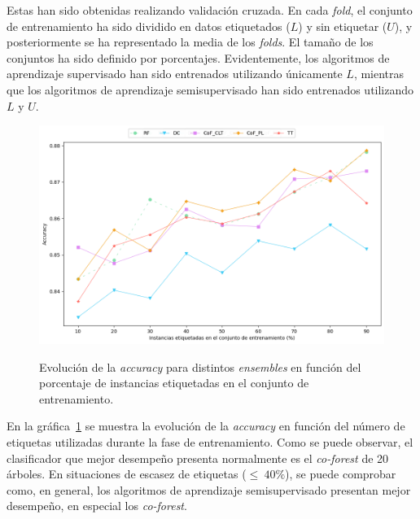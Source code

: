 Estas han sido obtenidas realizando validación cruzada. En cada \textit{fold}, el conjunto de entrenamiento ha sido dividido en datos etiquetados ($L$) y sin etiquetar ($U$), y posteriormente se ha representado la media de los \textit{folds}. El tamaño de los conjuntos ha sido definido por porcentajes. Evidentemente, los algoritmos de aprendizaje supervisado han sido entrenados utilizando únicamente $L$, mientras que los algoritmos de aprendizaje semisupervisado han sido entrenados utilizando $L$ y $U$.

\begin{figure}[h]
	\caption[\textit{Phishing}: comparativa SL contra SSL (\textit{accuracy})]{Evolución de la \textit{accuracy} para distintos \textit{ensembles} en función del porcentaje de instancias etiquetadas en el conjunto de entrenamiento.}
	\centering
	\includegraphics[scale=0.45]{../img/memoria/5_phishing/f1f19_evolution_acc}
	\label{gr:ph-f1f19_sl-ssl-acc}
\end{figure}

En la gráfica~\ref{gr:ph-f1f19_sl-ssl-acc} se muestra la evolución de la \textit{accuracy} en función del número de etiquetas utilizadas durante la fase de entrenamiento. Como se puede observar, el clasificador que mejor desempeño presenta normalmente es el \textit{co-forest} de 20 árboles. En situaciones de escasez de etiquetas ($\le~40\%$), se puede comprobar como, en general, los algoritmos de aprendizaje semisupervisado presentan mejor desempeño, en especial los \textit{co-forest}.

